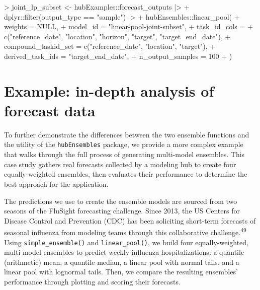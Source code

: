 \documentclass[
]{article}
\newenvironment{Shaded}{\begin{snugshade}}{\end{snugshade}}
\newcommand{\AttributeTok}[1]{\textcolor[rgb]{0.40,0.45,0.13}{#1}}
\newcommand{\ConstantTok}[1]{\textcolor[rgb]{0.56,0.35,0.01}{#1}}
\newcommand{\DecValTok}[1]{\textcolor[rgb]{0.68,0.00,0.00}{#1}}
\newcommand{\FunctionTok}[1]{\textcolor[rgb]{0.28,0.35,0.67}{#1}}
\newcommand{\NormalTok}[1]{\textcolor[rgb]{0.00,0.23,0.31}{#1}}
\newcommand{\OtherTok}[1]{\textcolor[rgb]{0.00,0.23,0.31}{#1}}
\newcommand{\SpecialCharTok}[1]{\textcolor[rgb]{0.37,0.37,0.37}{#1}}
\newcommand{\StringTok}[1]{\textcolor[rgb]{0.13,0.47,0.30}{#1}}
\begin{document}
\begin{Shaded}
\begin{Highlighting}[]
\SpecialCharTok{\textgreater{}}\NormalTok{ joint\_lp\_subset }\OtherTok{\textless{}{-}}\NormalTok{ hubExamples}\SpecialCharTok{::}\NormalTok{forecast\_outputs }\SpecialCharTok{|\textgreater{}}
\SpecialCharTok{+}\NormalTok{   dplyr}\SpecialCharTok{::}\FunctionTok{filter}\NormalTok{(output\_type }\SpecialCharTok{==} \StringTok{"sample"}\NormalTok{) }\SpecialCharTok{|\textgreater{}}
\SpecialCharTok{+}\NormalTok{   hubEnsembles}\SpecialCharTok{::}\FunctionTok{linear\_pool}\NormalTok{(}
\SpecialCharTok{+}     \AttributeTok{weights =} \ConstantTok{NULL}\NormalTok{,}
\SpecialCharTok{+}     \AttributeTok{model\_id =} \StringTok{"linear{-}pool{-}joint{-}subset"}\NormalTok{,}
\SpecialCharTok{+}     \AttributeTok{task\_id\_cols =}
\SpecialCharTok{+}       \FunctionTok{c}\NormalTok{(}\StringTok{"reference\_date"}\NormalTok{, }\StringTok{"location"}\NormalTok{, }\StringTok{"horizon"}\NormalTok{, }\StringTok{"target"}\NormalTok{, }\StringTok{"target\_end\_date"}\NormalTok{),}
\SpecialCharTok{+}     \AttributeTok{compound\_taskid\_set =} \FunctionTok{c}\NormalTok{(}\StringTok{"reference\_date"}\NormalTok{, }\StringTok{"location"}\NormalTok{, }\StringTok{"target"}\NormalTok{),}
\SpecialCharTok{+}     \AttributeTok{derived\_task\_ids =} \StringTok{"target\_end\_date"}\NormalTok{,}
\SpecialCharTok{+}     \AttributeTok{n\_output\_samples =} \DecValTok{100}
\SpecialCharTok{+}\NormalTok{   )}
\end{Highlighting}
\end{Shaded}

\section{Example: in-depth analysis of forecast
data}\label{sec-case-study}

To further demonstrate the differences between the two ensemble
functions and the utility of the \texttt{hubEnsembles} package, we
provide a more complex example that walks through the full process of
generating multi-model ensembles. This case study gathers real forecasts
collected by a modeling hub to create four equally-weighted ensembles,
then evaluates their performance to determine the best approach for the
application.

The predictions we use to create the ensemble models are sourced from
two seasons of the FluSight forecasting challenge. Since 2013, the US
Centers for Disease Control and Prevention (CDC) has been soliciting
short-term forecasts of seasonal influenza from modeling teams through
this collaborative challenge.\textsuperscript{49} Using
\texttt{simple\_ensemble()} and \texttt{linear\_pool()}, we build four
equally-weighted, multi-model ensembles to predict weekly influenza
hospitalizations: a quantile (arithmetic) mean, a quantile median, a
linear pool with normal tails, and a linear pool with lognormal tails.
Then, we compare the resulting ensembles' performance through plotting
and scoring their forecasts.
\end{document}
